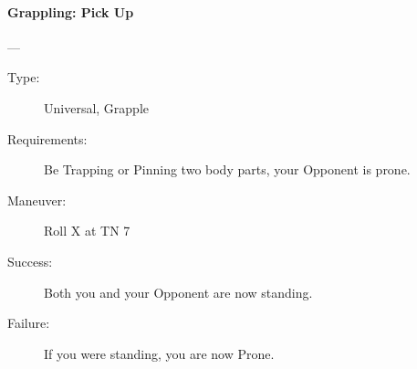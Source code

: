\paragraph{Grappling: Pick Up \large} \label{man:grappling-pick-up}
---
\vspace{-10pt} \begin{description}
\item [Type:]
 Universal, Grapple
\item [Requirements:]
 Be Trapping or Pinning two body parts, your Opponent is prone.
\item [Maneuver:]
 Roll X at TN 7
\item [Success:]
 Both you and your Opponent are now standing.
\item [Failure:]
 If you were standing, you are now Prone.
\end{description}
